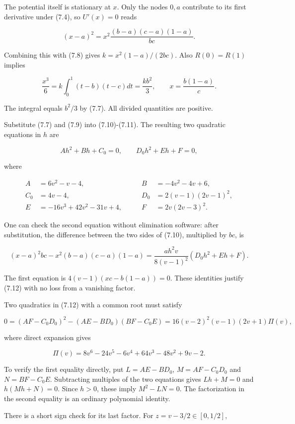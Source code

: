 \documentclass[11pt]{article}
\begin{document}
The potential itself is stationary at \(x\). Only the nodes \(0,a\)
contribute to its first derivative under (7.4), so \(U'(x)=0\) reads

\[
(x-a)^2=x^2\frac{(b-a)(c-a)(1-a)}{bc}.
\tag{7.10}
\]

Combining this with (7.8) gives \(k=x^2(1-a)/(2bc)\). Also \(R(0)=R(1)\)
implies

\[
\frac{x^3}{6}
=k\int_0^1(t-b)(t-c)dt
=\frac{k b^2}{3},\qquad
x=\frac{b(1-a)}c.
\tag{7.11}
\]

The integral equals \(b^2/3\) by (7.7). All divided quantities are
positive.

Substitute (7.7) and (7.9) into (7.10)-(7.11). The resulting two
quadratic equations in \(h\) are

\[
A h^2+B h+C_0=0,\qquad D_0h^2+E h+F=0,
\tag{7.12}
\]

where

\[
\begin{aligned}
A&=6v^2-v-4,& B&=-4v^2-4v+6,\\
C_0&=4v-4,& D_0&=2(v-1)(2v-1)^2,\\
E&=-16v^3+42v^2-31v+4,\qquad& F&=2v(2v-3)^2.
\end{aligned}
\tag{7.13}
\]

One can check the second equation without elimination software: after
substitution, the difference between the two sides of (7.10), multiplied
by \(bc\), is

\[
(x-a)^2bc-x^2(b-a)(c-a)(1-a)
=\frac{a h^2v}{8(v-1)^2}(D_0h^2+Eh+F).
\tag{7.14}
\]

The first equation is \(4(v-1)(xc-b(1-a))=0\). These identities justify
(7.12) with no loss from a vanishing factor.

Two quadratics in (7.12) with a common root must satisfy

\[
0=(AF-C_0D_0)^2-(AE-BD_0)(BF-C_0E)
=16(v-2)^2(v-1)(2v+1)\Pi(v),
\tag{7.15}
\]

where direct expansion gives

\[
\Pi(v)=8v^6-24v^5-6v^4+64v^3-48v^2+9v-2.
\tag{7.16}
\]

To verify the first equality directly, put \(L=AE-BD_0\),
\(M=AF-C_0D_0\) and \(N=BF-C_0E\). Subtracting multiples of the two
equations gives \(Lh+M=0\) and \(h(Mh+N)=0\). Since \(h>0\), these imply
\(M^2-LN=0\). The factorization in the second equality is an ordinary
polynomial identity.

There is a short sign check for its last factor. For
\(z=v-3/2\in[0,1/2]\),
\end{document}
